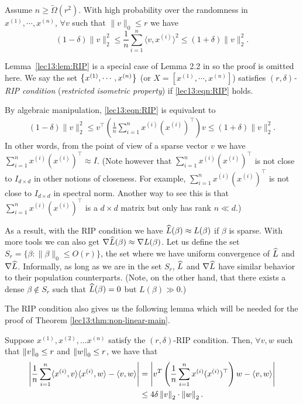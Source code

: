 \begin{lemma}\label{lec13:lem:RIP}
Assume $n\ge \widetilde\Omega(r^2)$. With high probability over the randomness in $x^{(1)},\cdots,x^{(n)}$, $\forall v$ such that $\|v\|_0\le r$ we have
\begin{equation}\label{lec13:eqn:RIP}
(1-\delta)\|v\|_2^2\le \frac{1}{n}\sum_{i=1}^{n}\langle v,x^{(i)}\rangle^2\le (1+\delta)\|v\|_2^2.
\end{equation}
\end{lemma}

Lemma~\ref{lec13:lem:RIP} is a special case of Lemma 2.2 in \cite{li2018algorithmic} so the proof is omitted here. We say the set $\left\{ x^{(1)},\cdots,x^{(n)} \right\}$ (or $X=[x^{(1)},\cdots,x^{(n)}]$) satisfies $(r,\delta)$\textit{-RIP condition} (\textit{restricted isometric property}) if \eqref{lec13:eqn:RIP} holds.

By algebraic manipulation, \eqref{lec13:eqn:RIP} is equivalent to 
\begin{align}\label{lec13:eqn:RIP-2}
(1-\delta)\|v\|_2^2\le v^\top \left(\frac{1}{n}\sum_{i=1}^{n}x^{(i)}(x^{(i)})^\top\right)v\le (1+\delta)\|v\|_2^2.
\end{align}
In other words, from the point of view of a sparse vector $v$ we have $\sum_{i=1}^{n}x^{(i)}(x^{(i)})^\top\approx I$. (Note however that $\sum_{i=1}^{n}x^{(i)}(x^{(i)})^\top$ is not close to $I_{d\times d}$ in other notions of closeness. For example, $\sum_{i=1}^{n}x^{(i)}(x^{(i)})^\top$ is not close to $I_{d\times d}$ in spectral norm. Another way to see this is that $\sum_{i=1}^{n}x^{(i)}(x^{(i)})^\top$ is a $d \times d$ matrix but only has rank $n \ll d$.)

As a result, with the RIP condition we have $\widehat{L}(\beta)\approx L(\beta)$ if $\beta$ is sparse. With more tools we can also get $\nabla \widehat{L}(\beta)\approx \nabla L(\beta)$. Let us define the set $S_r=\{\beta:\|\beta\|_0\le O(r)\}$, the set where we have uniform convergence of $\widehat{L}$ and $\nabla \widehat{L}$. Informally, as long as we are in the set $S_r$, $\widehat{L}$ and $\nabla\widehat{L}$ have similar behavior to their population counterparts. (Note, on the other hand, that there exists a dense $\beta\not\in S_r$ such that $\widehat{L}(\beta)=0$ but $L(\beta)\gg 0.$)

The RIP condition also gives us the following lemma which will be needed for the proof of Theorem \ref{lec13:thm:non-linear-main}.

\begin{lemma}\label{lec14:lem:rip}
    Suppose $x^{(1)}, x^{(2)}, \dots x^{(n)}$ satisfy the $(r, \delta)$-RIP condition. Then, $\forall v, w$ such that $\left\|v\right\|_{0} \leq r$ and $\left\|w\right\|_{0} \leq r$, we have that
    \begin{align}
        \left| \frac{1}{n} \sum_{i=1}^{n} \langle x^{(i)}, v \rangle \langle x^{(i)}, w \rangle  - \langle v, w \rangle \right| &= \left|  v^{T} \left(\frac{1}{n} \sum_{i=1}^{n}  x^{(i)} (x^{(i)})^\top \right)  w  - \langle v, w \rangle \right| \\
        &\leq 4 \delta \left\|v\right\|_{2} \cdot \left\|w\right\|_{2}.
    \end{align} 
\end{lemma}

